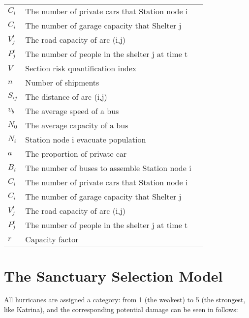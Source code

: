 \documentclass{mcmthesis}
\begin{document}
\begin{center}
\begin{longtable}{p{}p{}m{}}
$C_i$       & The number of private cars that Station node i                            \\
$C_i$        & The number of garage capacity that Shelter j                             \\
$V_j^t$       & The road capacity of arc (i,j)                                            \\
$P_j^t$       & The number of people in the shelter j at time t                          \\
$V$       & Section risk quantification index                                         \\
$n$       & Number of shipments                                                     \\
$S_{ij}$       & The distance of arc (i,j)                                                \\
$v_b$       & The average speed of a bus                                                \\
$N_0$       & The average capacity of a bus                                             \\
$N_i$       & Station node i evacuate population                                        \\
$a$       & The proportion of private car                                           \\
$B_i$       & The number of buses to assemble Station node i                            \\
$C_i$       & The number of private cars that Station node i                            \\
$C_i$        & The number of garage capacity that Shelter j                             \\
$V_j^t$       & The road capacity of arc (i,j)                                            \\
$P_j^t$       & The number of people in the shelter j at time t                          \\
$r$       & Capacity factor                                                          \\ \hline

 \end{longtable}
 \end{center}


\section{The Sanctuary Selection Model}
All hurricanes are assigned a category: from 1 (the weakest) to 5 (the strongest, like Katrina), and the corresponding potential damage can be seen in  follows:
\end{document}
